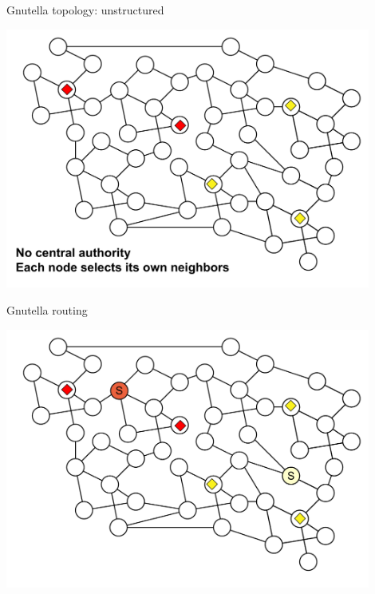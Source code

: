 \begin{frame}{Gnutella topology: unstructured}
	
\includegraphics[width=0.9\textwidth]{gnutella1}

\end{frame}


\begin{frame}{Gnutella routing}
	
\includegraphics[width=0.9\textwidth]{gnutella2}

\end{frame}

